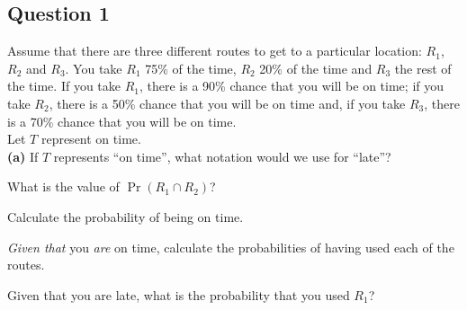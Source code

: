 \subsection*{Question 1}
Assume that there are three different routes to get to a particular location: $R_1$, $R_2$ and $R_3$. You take $R_1$ 75\% of the time, $R_2$ 20\% of the time and $R_3$ the rest of the time. If you take $R_1$, there is a 90\% chance that you will be on time; if you take $R_2$, there is a 50\% chance that you will be on time and, if you take $R_3$, there is a 70\% chance that you will be on time. \\[0.1cm]
Let $T$ represent on time.\\[-0.2cm]

{\bf(a)} If $T$ represents ``on time'', what notation would we use for ``late''? 
 \item  What is the value of $\Pr(R_1 \cap R_2)$? 
 \item  Calculate the probability of being on time. 
 \item  \emph{Given that} you \emph{are} on time, calculate the probabilities of having used each of the routes. 
 \item  Given that you are late, what is the probability that you used $R_1$?






